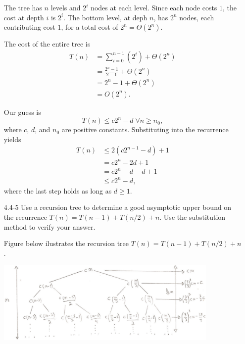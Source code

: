 \documentclass{report}
\makeatletter
\renewenvironment{framed}{%
 \def\FrameCommand##1{\hskip\@totalleftmargin
 \fboxsep=\FrameSep\fbox{##1}}%
 \MakeFramed {\advance\hsize-\width
   \@totalleftmargin\z@ \linewidth\hsize
   \@setminipage}}%
 {\par\unskip\endMakeFramed}
\DeclareMathOperator{\Forall}{\forall}
\makeatother
\begin{document}
\begin{enumerate}
\begin{framed}
The tree has $n$ levels and $2^i$ nodes at each level. Since each node costs
$1$, the cost at depth $i$ is $2^i$. The bottom level, at deph $n$,
has $2^n$ nodes, each contributing cost $1$, for a total
cost of $2^n = \Theta(2^n)$.

The cost of the entire tree is
\begin{equation*}
\begin{aligned}
  T(n) &= \sum_{i = 0}^{n - 1} (2^i) + \Theta(2^n)\\
       &= \frac{2^n - 1}{2 - 1} + \Theta(2^n)\\
       &= 2^n - 1 + \Theta(2^n)\\
       &= O(2^n).
\end{aligned}
\end{equation*}

Our guess is
\[
T(n) \le c 2^n - d \; \Forall n \ge n_0,
\]
where $c$, $d$, and $n_0$ are positive constants. Substituting into the
recurrence yields
\begin{equation*}
\begin{aligned}
  T(n) &\le 2 (c 2^{n - 1} - d) + 1\\
       &= c2^n - 2d + 1\\
       &= c2^n - d - d + 1\\
       &\le c 2^n - d,
\end{aligned}
\end{equation*}
where the last step holds as long as $d \ge 1$.
\end{framed}

\newpage

\item[4.4{-}5]{Use a recursion tree to determine a good asymptotic upper bound
on the recurrence $T(n) = T(n - 1) + T(n/2) + n$. Use the substitution method to
verify your answer.}

\begin{framed}
Figure below ilustrates the recursion tree $T(n) = T(n - 1) + T(n/2) + n$.

\begin{center}
\includegraphics[width=0.85\textwidth]{images/4_4_5_1.pdf}
\end{center}


\end{framed}
\end{enumerate}
\end{document}
